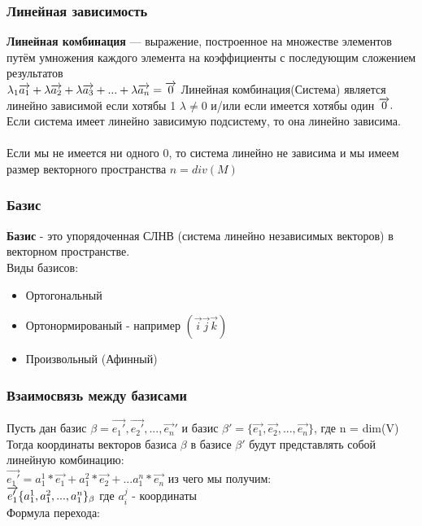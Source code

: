 \documentclass{article}
\begin{document}
\subsubsection{Линейная зависимость}
\textbf{Линейная комбинация} — выражение, построенное на множестве элементов путём умножения каждого элемента на коэффициенты с последующим сложением результатов\\
$\lambda_1\overrightarrow{a_1}+\lambda\overrightarrow{a_2}+\lambda\overrightarrow{a_3}+...+\lambda\overrightarrow{a_n}=\overrightarrow{0}\\$
Линейная комбинация(Система) является линейно зависимой если хотябы 1 $\lambda\neq0$ и/или если имеется хотябы один $\overrightarrow{0}.\\$
Если система имеет линейно зависимую подсистему, то она линейно зависима.\\\\
Если мы не имеется ни одного 0, то система линейно не зависима и мы имеем размер векторного пространства $n = div(M)$
\subsubsection{Базис}
\textbf{Базис} - это упорядоченная СЛНВ (система линейно независимых векторов) в векторном пространстве.\\
Виды базисов:
\begin{itemize}
    \item Ортогональный
    \item Ортонормированый - например $(\overrightarrow{i}\overrightarrow{j}\overrightarrow{k})$
    \item Произвольный (Афинный)
\end{itemize}
\subsubsection{Взаимосвязь между базисами}
Пусть дан базис $\beta={\overrightarrow{e_1'},\overrightarrow{e_2'},...,\overrightarrow{e_n}'}$ и базис $\beta'=\{\overrightarrow{e_1},\overrightarrow{e_2},...,\overrightarrow{e_n}\}$, где n = dim(V)\\
Тогда координаты векторов базиса $\beta$ в базисе $\beta'$ будут представлять собой линейную комбинацию: \\
$\overrightarrow{e_1'}=a_1^1*\overrightarrow{e_1}+a_1^2*\overrightarrow{e_2}+...a_1^n*\overrightarrow{e_n}$ из чего мы получим:\\
$\overrightarrow{e_1'}\{a_1^1,a_1^2,...,a_1^n\}_\beta\\$
где $a^j_i$ - координаты\\
Формула перехода:
\end{document}
